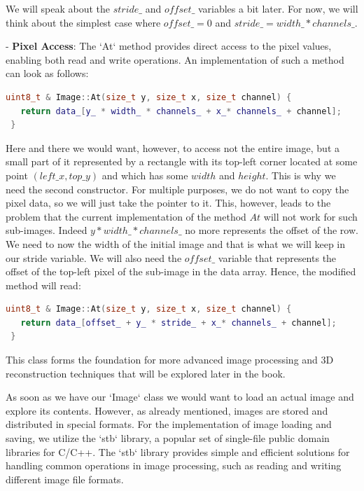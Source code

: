 \documentclass[11pt]{book}
\begin{document}
We will speak about the $stride\_$ and $offset\_$ variables a bit later. For now, we will think about the simplest case where $offset\_ = 0$ and $stride\_ = width\_ * channels\_$.   

- \textbf{Pixel Access}: The `At` method provides direct access to the pixel values, enabling both read and write operations. An implementation of such a method can look as follows:

 \begin{lstlisting}[language=C++, caption={An implementation of the method At}]
 uint8_t & Image::At(size_t y, size_t x, size_t channel) {
   return data_[y_ * width_ * channels_ + x_* channels_ + channel];
 }	
 \end{lstlisting}

Here and there we would want, however, to access not the entire image, but a small part of it represented by a rectangle with its top-left corner located at some point $(left\_x, top\_y)$ and which has some $width$ and $height$. This is why we need the second constructor. For multiple purposes, we do not want to copy the pixel data, so we will just take the pointer to it. This, however, leads to the problem that the current implementation of the method $At$ will not work for such sub-images. Indeed $y* width\_ * channels\_$ no more represents the offset of the row. We need to now the width of the initial image and that is what we will keep in our stride variable. We will also need the $offset\_$ variable that represents the offset of the top-left pixel of the sub-image in the data array. Hence, the modified method will read:

 \begin{lstlisting}[language=C++, caption={An implementation of the method At}]
 uint8_t & Image::At(size_t y, size_t x, size_t channel) {
   return data_[offset_ + y_ * stride_ + x_* channels_ + channel];
 }	
 \end{lstlisting}


This class forms the foundation for more advanced image processing and 3D reconstruction techniques that will be explored later in the book.


As soon as we have our `Image` class we would want to load an actual image and explore its contents. However, as already mentioned, images are stored and distributed in special formats. For the implementation of image loading and saving, we utilize the `stb` library, a popular set of single-file public domain libraries for C/C++. The `stb` library provides simple and efficient solutions for handling common operations in image processing, such as reading and writing different image file formats.
\end{document}
